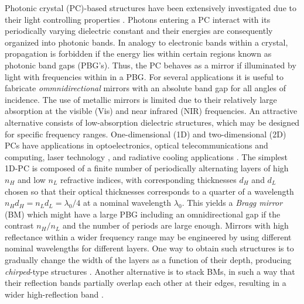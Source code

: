 \documentclass[a4paper,fleqn]{cas-sc}
\begin{document}
Photonic crystal (PC)-based structures have been extensively investigated due
to their light controlling properties \cite{Joannopoulos2008,Goyal2018}.
Photons entering a PC interact with its periodically varying dielectric constant and
their energies are consequently organized into photonic bands. In
analogy to electronic bands within a
crystal, propagation is forbidden if the energy lies
within certain regions known as photonic band gaps (PBG's). Thus, the
PC behaves as a mirror if illuminated by light with frequencies
within in a PBG. For several applications it is useful to fabricate
{\em ommnidirectional} mirrors with an absolute band gap for all angles of incidence.
The use of metallic
mirrors is limited due to their relatively large absorption at the
visible (Vis) and near infrared (NIR) frequencies.  An attractive alternative
consists of low-absorption dielectric
structures,  which may be designed for specific frequency
ranges. One-dimensional (1D) and two-dimensional (2D) PCs have
applications in optoelectronics, optical telecommunications and computing,
laser technology \cite{Lopez2003,Masaya2010}, and radiative cooling applications
\cite{Kumar2020}. The simplest 1D-PC is composed of a finite number
of periodically alternating
layers of high $n_{H}$ and low $n_{L}$ refractive indices, with
corresponding thicknesses $d_H$ and $d_L$ chosen so that their optical
thicknesses corresponds to a quarter of a wavelength
$n_{H}d_{H}=n_{L}d_{L}=\lambda_{0}/4$ at a nominal
wavelength $\lambda_{0}$. This yields a {\em Bragg mirror} (BM)
which might have a large PBG including an omnidirectional gap if the contrast $n_H/n_L$
and the number of periods are large enough. Mirrors with high
reflectance within a wider frequency range may be engineered by
using different nominal wavelengths for different layers.
One way to obtain such structures is to gradually change the width of
the layers as a function of their depth, producing
\textit{chirped}-type structures \cite{Zipock1997}.
Another alternative is to stack BMs, in such a way that their reflection bands partially
overlap each other at their edges, resulting in a wider high-reflection band \cite{Xifre2009}.
\end{document}
